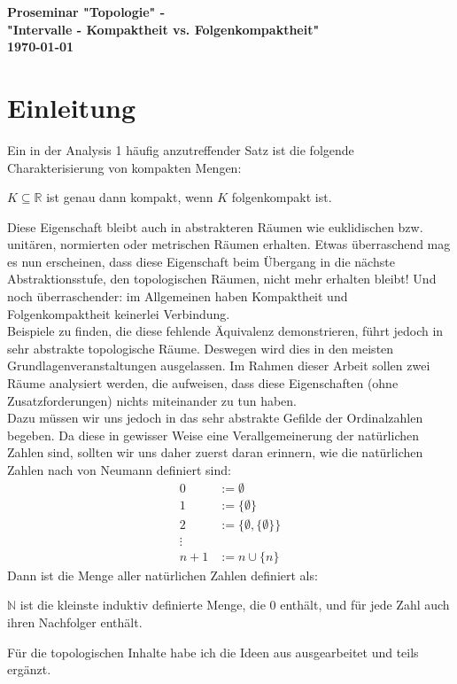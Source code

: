 \documentclass[11pt]{scrartcl}
\newcommand{\R}{\mathbb{R}}
\newcommand{\N}{\mathbb{N}}
\begin{document}
\begin{titlepage}
	\centering
	\Huge
	\textbf{Proseminar "Topologie" - }\\
	\vspace*{1cm}
	\Large
	\textbf{"Intervalle - Kompaktheit vs. Folgenkompaktheit"}\\
	\vspace*{2cm}
	\large
	\textbf{\today}
\end{titlepage}
\section{Einleitung}
Ein in der Analysis 1 häufig anzutreffender Satz ist die folgende Charakterisierung von kompakten Mengen:
\begin{theorem}
	$ K \subseteq \R$ ist genau dann kompakt, wenn $K$ folgenkompakt ist.
\end{theorem}
Diese Eigenschaft bleibt auch in abstrakteren Räumen wie euklidischen bzw. unitären, normierten oder metrischen Räumen erhalten. Etwas überraschend mag es nun erscheinen, dass diese Eigenschaft beim Übergang in die nächste Abstraktionsstufe, den topologischen Räumen, nicht mehr erhalten bleibt! Und noch überraschender: im Allgemeinen haben Kompaktheit und Folgenkompaktheit keinerlei Verbindung.\\
Beispiele zu finden, die diese fehlende Äquivalenz demonstrieren, führt jedoch in sehr abstrakte topologische Räume. Deswegen wird dies in den meisten Grundlagenveranstaltungen ausgelassen. 
Im Rahmen dieser Arbeit sollen zwei Räume analysiert werden, die aufweisen, dass diese Eigenschaften (ohne Zusatzforderungen) nichts miteinander zu
tun haben.\\
Dazu müssen wir uns jedoch in das sehr abstrakte Gefilde der Ordinalzahlen begeben. Da diese in gewisser Weise eine Verallgemeinerung der natürlichen Zahlen sind, sollten wir uns daher
zuerst daran erinnern, wie die natürlichen Zahlen nach von Neumann definiert sind:
\begin{align*}
	0 &:= \emptyset \\
	1 &:= \{\emptyset\}\\
	2 &:= \{\emptyset, \{\emptyset\}\}\\
	\vdots \\
	n+1 &:= n \cup \{ n\}
\end{align*}
Dann ist die Menge aller natürlichen Zahlen definiert als:
\begin{definition}
	$\N$ ist die kleinste induktiv definierte Menge, die $0$ enthält, und für jede Zahl auch ihren 
	Nachfolger enthält.
\end{definition}
\noindent Für die topologischen Inhalte habe ich die Ideen aus  ausgearbeitet und teils ergänzt.
\end{document}
